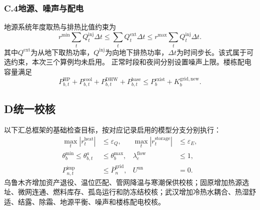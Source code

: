 \subsubsection*{C.4\quad 地源、噪声与配电}

地源系统年度取热与排热比值约束为
\begin{equation}
r^{\min}\sum_tQ_t^{\mathrm{inj}}\Delta t
\leq\sum_tQ_t^{\mathrm{ext}}\Delta t
\leq r^{\max}\sum_tQ_t^{\mathrm{inj}}\Delta t.
\end{equation}
其中$Q^{\mathrm{ext}}$为从地下取热功率，$Q^{\mathrm{inj}}$为向地下排热功率，$\Delta t$为时间步长。该式属于可选约束，本次三个算例均未启用。
正常时段和夜间分别设置噪声上限。楼栋配电容量满足
\begin{equation}
P_{b,t}^{\mathrm{HP}}+P_{b,t}^{\mathrm{cool}}+P_{b,t}^{\mathrm{DHW}}+P_{b,t}^{\mathrm{base}}
\leq P_b^{\mathrm{exist}}+K_b^{\mathrm{grid,new}}.
\end{equation}

\subsection*{D\quad 统一校核}

以下汇总框架的基础检查目标，按对应记录启用的模型分支分别执行：
\begin{align}
\max_t|r_t^{\mathrm{heat}}|&\leq\varepsilon_Q,&
\max_t|r_t^{\mathrm{storage}}|&\leq\varepsilon_E,\\
\theta_b^{\min}\leq\theta_{b,t}^{a}&\leq\theta_b^{\max},&
\lambda_e^{\mathrm{flow}}&\leq1,\\
P_{n,t}^{\mathrm{imp}}&\leq\overline P_n^{\mathrm{grid}},&
U^{\mathrm{un}}&=0.
\end{align}
乌鲁木齐增加资产退役、温位匹配、管网降温与寒潮保供校核；固原增加热源选址、微网连通、燃料库存、孤岛运行和防冻结校核；武汉增加冷热水耦合、热湿舒适、结露、除霜、地源平衡、噪声和楼栋配电校核。
